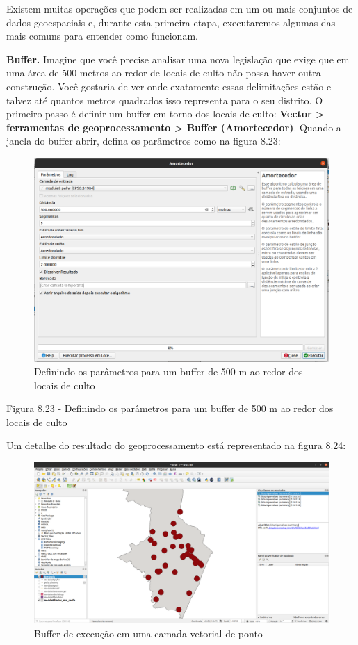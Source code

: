 \documentclass[
  portuguese,
]{krantz}
\begin{document}
Existem muitas operações que podem ser realizadas em um ou mais conjuntos de dados geoespaciais e, durante esta primeira etapa, executaremos algumas das mais comuns para entender como funcionam.

\textbf{Buffer.} Imagine que você precise analisar uma nova legislação que exige que em uma área de 500 metros ao redor de locais de culto não possa haver outra construção. Você gostaria de ver onde exatamente essas delimitações estão e talvez até quantos metros quadrados isso representa para o seu distrito. O primeiro passo é definir um buffer em torno dos locais de culto: \textbf{Vector \textgreater{} ferramentas de geoprocessamento \textgreater{} Buffer (Amortecedor)}. Quando a janela do buffer abrir, defina os parâmetros como na figura 8.23:

\begin{figure}
\centering
\includegraphics{media/modulo8/fig823.png}
\caption{Definindo os parâmetros para um buffer de 500 m ao redor dos locais de culto}
\end{figure}

Figura 8.23 \hspace{0pt}\hspace{0pt}- Definindo os parâmetros para um buffer de 500 m ao redor dos locais de culto

Um detalhe do resultado do geoprocessamento está representado na figura 8.24:

\begin{figure}
\centering
\includegraphics{media/modulo8/fig824.png}
\caption{Buffer de execução em uma camada vetorial de ponto}
\end{figure}
\end{document}
